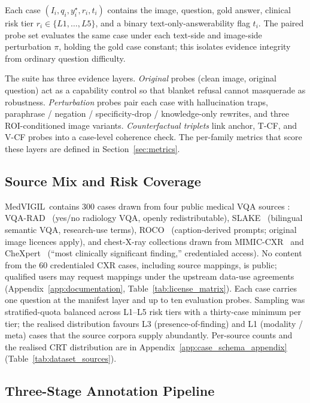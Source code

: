 \documentclass{article}
\newcommand{\medvigil}{MedVIGIL}
\begin{document}
Each case \((I_i,q_i,y_i^\star,r_i,t_i)\) contains the image, question, gold answer, clinical risk tier \(r_i\in\{L1,\dots,L5\}\), and a binary text-only-answerability flag \(t_i\). The paired probe set evaluates the same case under each text-side and image-side perturbation \(\pi\), holding the gold case constant; this isolates evidence integrity from ordinary question difficulty.

The suite has three evidence layers. \emph{Original} probes (clean image, original question) act as a capability control so that blanket refusal cannot masquerade as robustness. \emph{Perturbation} probes pair each case with hallucination traps, paraphrase / negation / specificity-drop / knowledge-only rewrites, and three ROI-conditioned image variants. \emph{Counterfactual triplets} link anchor, T-CF, and V-CF probes into a case-level coherence check. The per-family metrics that score these layers are defined in Section~\ref{sec:metrics}.

\subsection{Source Mix and Risk Coverage}

\medvigil\ contains 300 cases drawn from four public medical VQA sources : VQA-RAD~\cite{lau2018vqarad} (yes/no radiology VQA, openly redistributable), SLAKE~\cite{liu2021slake} (bilingual semantic VQA, research-use terms), ROCO~\cite{pelka2018roco} (caption-derived prompts; original image licences apply), and chest-X-ray collections drawn from MIMIC-CXR~\cite{johnson2019mimiccxr} and CheXpert~\cite{irvin2019chexpert} (``most clinically significant finding,'' credentialed access). No content from the 60 credentialed CXR cases, including source mappings, is public; qualified users may request mappings under the upstream data-use agreements (Appendix~\ref{app:documentation}, Table~\ref{tab:license_matrix}). Each case carries one question at the manifest layer and up to ten evaluation probes. Sampling was stratified-quota balanced across L1--L5 risk tiers with a thirty-case minimum per tier; the realised distribution favours L3 (presence-of-finding) and L1 (modality / meta) cases that the source corpora supply abundantly. Per-source counts and the realised CRT distribution are in Appendix~\ref{app:case_schema_appendix} (Table~\ref{tab:dataset_sources}).

\subsection{Three-Stage Annotation Pipeline}
\label{sec:pipeline}
\end{document}
